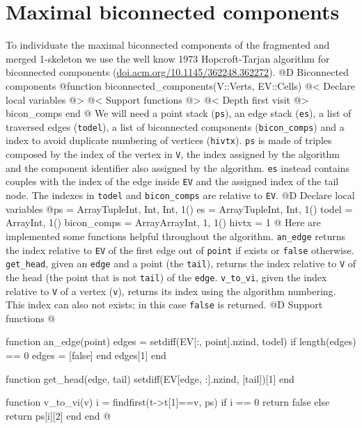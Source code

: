 \documentclass[10pt,oneside]{article}
\begin{document}
\section{Maximal biconnected components}
To individuate the maximal biconnected components of the fragmented and merged 1-skeleton
we use the well know 1973 Hopcroft-Tarjan algorithm for biconnected components (\url{doi.acm.org/10.1145/362248.362272}).
@D Biconnected components
@{function biconnected_components(V::Verts, EV::Cells)
    @< Declare local variables @>
    @< Support functions @>
    @< Depth first visit @>
    bicon_comps
end
@}
We will need a point stack (\texttt{ps}), an edge stack (\texttt{es}), a list of traversed edges (\texttt{todel}), 
a list of biconnected components (\texttt{bicon\_comps}) and a index to avoid duplicate numbering of vertices (\texttt{hivtx}).
\texttt{ps} is made of triples composed by the index of the vertex in \texttt{V}, the index assigned by the algorithm 
and the component identifier also assigned by the algorithm. \texttt{es} instead contains couples with the index of 
the edge inside \texttt{EV} and the assigned index of the tail node. The indexes in \texttt{todel} and \texttt{bicon\_comps}
are relative to \texttt{EV}.
@D Declare local variables
@{ps = Array{Tuple{Int, Int, Int}, 1}()
es = Array{Tuple{Int, Int}, 1}()
todel = Array{Int, 1}()
bicon_comps = Array{Array{Int, 1}, 1}()
hivtx = 1
@}
Here are implemented some functions helpful throughout the algorithm.
\texttt{an\_edge} returns the index relative to \texttt{EV} of the first edge out of \texttt{point} if exists or \texttt{false} otherwise.
\texttt{get\_head}, given an \texttt{edge} and a point (the \texttt{tail}), returns the index relative 
to \texttt{V} of the head (the point that is not \texttt{tail}) of the \texttt{edge}. 
\texttt{v\_to\_vi}, given the index relative to \texttt{V} of a vertex (\texttt{v}), returns its index using the algorithm numbering.
This index can also not exists; in this case \texttt{false} is returned.
@D Support functions
@{function an_edge(point)
    edges = setdiff(EV[:, point].nzind, todel)
    if length(edges) == 0
        edges = [false]
    end
    edges[1]
end

function get_head(edge, tail)
    setdiff(EV[edge, :].nzind, [tail])[1]
end

function v_to_vi(v)
    i = findfirst(t->t[1]==v, ps)
    if i == 0
        return false
    else
        return ps[i][2]
    end
end
@}
\end{document}

